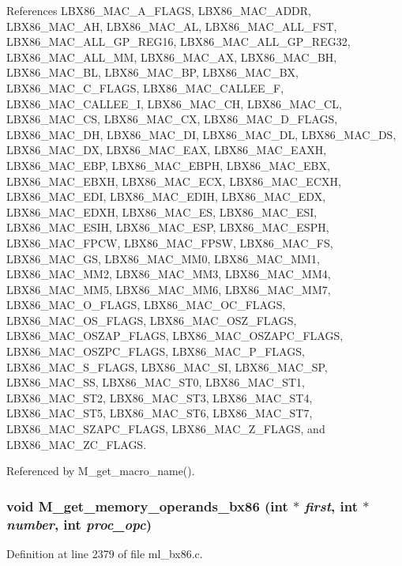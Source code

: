 References LBX86\_\-MAC\_\-A\_\-FLAGS, LBX86\_\-MAC\_\-ADDR, LBX86\_\-MAC\_\-AH, LBX86\_\-MAC\_\-AL, LBX86\_\-MAC\_\-ALL\_\-FST, LBX86\_\-MAC\_\-ALL\_\-GP\_\-REG16, LBX86\_\-MAC\_\-ALL\_\-GP\_\-REG32, LBX86\_\-MAC\_\-ALL\_\-MM, LBX86\_\-MAC\_\-AX, LBX86\_\-MAC\_\-BH, LBX86\_\-MAC\_\-BL, LBX86\_\-MAC\_\-BP, LBX86\_\-MAC\_\-BX, LBX86\_\-MAC\_\-C\_\-FLAGS, LBX86\_\-MAC\_\-CALLEE\_\-F, LBX86\_\-MAC\_\-CALLEE\_\-I, LBX86\_\-MAC\_\-CH, LBX86\_\-MAC\_\-CL, LBX86\_\-MAC\_\-CS, LBX86\_\-MAC\_\-CX, LBX86\_\-MAC\_\-D\_\-FLAGS, LBX86\_\-MAC\_\-DH, LBX86\_\-MAC\_\-DI, LBX86\_\-MAC\_\-DL, LBX86\_\-MAC\_\-DS, LBX86\_\-MAC\_\-DX, LBX86\_\-MAC\_\-EAX, LBX86\_\-MAC\_\-EAXH, LBX86\_\-MAC\_\-EBP, LBX86\_\-MAC\_\-EBPH, LBX86\_\-MAC\_\-EBX, LBX86\_\-MAC\_\-EBXH, LBX86\_\-MAC\_\-ECX, LBX86\_\-MAC\_\-ECXH, LBX86\_\-MAC\_\-EDI, LBX86\_\-MAC\_\-EDIH, LBX86\_\-MAC\_\-EDX, LBX86\_\-MAC\_\-EDXH, LBX86\_\-MAC\_\-ES, LBX86\_\-MAC\_\-ESI, LBX86\_\-MAC\_\-ESIH, LBX86\_\-MAC\_\-ESP, LBX86\_\-MAC\_\-ESPH, LBX86\_\-MAC\_\-FPCW, LBX86\_\-MAC\_\-FPSW, LBX86\_\-MAC\_\-FS, LBX86\_\-MAC\_\-GS, LBX86\_\-MAC\_\-MM0, LBX86\_\-MAC\_\-MM1, LBX86\_\-MAC\_\-MM2, LBX86\_\-MAC\_\-MM3, LBX86\_\-MAC\_\-MM4, LBX86\_\-MAC\_\-MM5, LBX86\_\-MAC\_\-MM6, LBX86\_\-MAC\_\-MM7, LBX86\_\-MAC\_\-O\_\-FLAGS, LBX86\_\-MAC\_\-OC\_\-FLAGS, LBX86\_\-MAC\_\-OS\_\-FLAGS, LBX86\_\-MAC\_\-OSZ\_\-FLAGS, LBX86\_\-MAC\_\-OSZAP\_\-FLAGS, LBX86\_\-MAC\_\-OSZAPC\_\-FLAGS, LBX86\_\-MAC\_\-OSZPC\_\-FLAGS, LBX86\_\-MAC\_\-P\_\-FLAGS, LBX86\_\-MAC\_\-S\_\-FLAGS, LBX86\_\-MAC\_\-SI, LBX86\_\-MAC\_\-SP, LBX86\_\-MAC\_\-SS, LBX86\_\-MAC\_\-ST0, LBX86\_\-MAC\_\-ST1, LBX86\_\-MAC\_\-ST2, LBX86\_\-MAC\_\-ST3, LBX86\_\-MAC\_\-ST4, LBX86\_\-MAC\_\-ST5, LBX86\_\-MAC\_\-ST6, LBX86\_\-MAC\_\-ST7, LBX86\_\-MAC\_\-SZAPC\_\-FLAGS, LBX86\_\-MAC\_\-Z\_\-FLAGS, and LBX86\_\-MAC\_\-ZC\_\-FLAGS.

Referenced by M\_\-get\_\-macro\_\-name().
\subsubsection{\setlength{\rightskip}{0pt plus 5cm}void M\_\-get\_\-memory\_\-operands\_\-bx86 (int $\ast$ {\em first}, int $\ast$ {\em number}, int {\em proc\_\-opc})}\label{m__bx86_8h_aeb1f7e6392818a6388672cb4207a20b}




Definition at line 2379 of file ml\_\-bx86.c.

